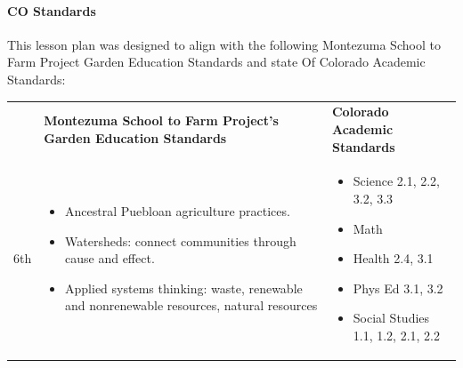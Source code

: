 \documentclass[12pt,]{article}
\providecommand{\tightlist}{%
  \setlength{\itemsep}{0pt}\setlength{\parskip}{0pt}}
\let\oldparagraph\paragraph
\renewcommand{\paragraph}[1]{\oldparagraph{#1}\mbox{}}
\begin{document}
\hypertarget{co-standards-1}{%
\paragraph{CO Standards}\label{co-standards-1}}

This lesson plan was designed to align with the following Montezuma School to Farm Project Garden Education Standards and state Of Colorado Academic Standards:

\begin{longtable}[]{@{}lll@{}}
\toprule
\endhead
\begin{minipage}[t]{0.09\columnwidth}\raggedright
\strut
\end{minipage} & \begin{minipage}[t]{0.44\columnwidth}\raggedright
\textbf{Montezuma School to Farm
Project's Garden Education
Standards}\strut
\end{minipage} & \begin{minipage}[t]{0.35\columnwidth}\raggedright
\textbf{Colorado Academic
Standards}\strut
\end{minipage}\tabularnewline
\begin{minipage}[t]{0.09\columnwidth}\raggedright
6th\strut
\end{minipage} & \begin{minipage}[t]{0.44\columnwidth}\raggedright
\begin{itemize}
\tightlist
\item
  Ancestral Puebloan agriculture
  practices.
\item
  Watersheds: connect communities
  through cause and effect.
\item
  Applied systems thinking:
  waste, renewable and
  nonrenewable resources,
  natural resources
\end{itemize}\strut
\end{minipage} & \begin{minipage}[t]{0.35\columnwidth}\raggedright
\begin{itemize}
\tightlist
\item
  Science 2.1, 2.2,
  3.2, 3.3
\item
  Math
\item
  Health 2.4, 3.1
\item
  Phys Ed 3.1, 3.2
\item
  Social Studies 1.1,
  1.2, 2.1, 2.2
\end{itemize}\strut
\end{minipage}\tabularnewline

\end{longtable}
\end{document}
